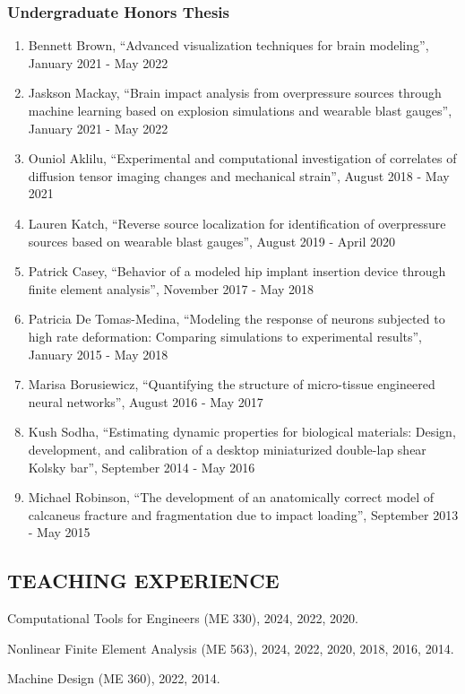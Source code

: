 \documentclass[11pt]{article}
\begin{document}
\subsubsection{Undergraduate Honors
Thesis}
\begin{enumerate}
\def\labelenumi{\arabic{enumi}.}
\item Bennett Brown, ``Advanced visualization techniques for brain modeling'', January 2021 - May 2022
\item Jaskson Mackay, ``Brain impact analysis from overpressure sources through machine learning based on explosion simulations and wearable blast gauges'', January 2021 - May 2022
\item Ouniol Aklilu, ``Experimental and computational investigation of correlates of diffusion tensor imaging changes and mechanical strain'', August 2018 - May 2021
\item Lauren Katch, ``Reverse source localization for identification of overpressure sources based on wearable blast gauges'', August 2019 - April 2020
\item Patrick Casey, ``Behavior of a modeled hip implant insertion device through finite element analysis'', November 2017 - May 2018
\item Patricia De Tomas-Medina, ``Modeling the response of neurons subjected to high rate deformation: Comparing simulations to experimental results'', January 2015 - May 2018
\item Marisa Borusiewicz, ``Quantifying the structure of micro-tissue engineered neural networks'', August 2016 - May 2017
\item Kush Sodha, ``Estimating dynamic properties for biological materials: Design, development, and calibration of a desktop miniaturized double-lap shear Kolsky bar'', September 2014 - May 2016
\item Michael Robinson, ``The development of an anatomically correct model of calcaneus fracture and fragmentation due to impact loading'', September 2013 - May 2015
\end{enumerate}\subsection{TEACHING EXPERIENCE}\label{teaching-experience}
Computational Tools for Engineers (ME 330), 2024, 2022, 2020.

Nonlinear Finite Element Analysis (ME 563), 2024, 2022, 2020, 2018, 2016, 2014.

Machine Design (ME 360), 2022, 2014.
\end{document}
